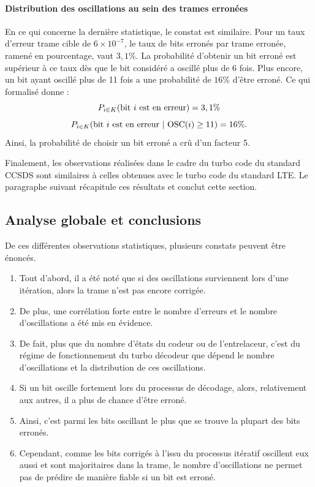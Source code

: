 \paragraph*{Distribution des oscillations au sein des trames erronées}
En ce qui concerne la dernière statistique, le constat est similaire. Pour un  taux d'erreur trame 
cible de $6\times 10^{-7}$, le taux de bits erronés par trame erronée, ramené en pourcentage, vaut $3,1\%$. La probabilité
d'obtenir un bit erroné est supérieur à ce taux dès que le bit considéré a oscillé plus de 6 fois. Plus encore, un bit 
ayant oscillé plus de 11 fois a une probabilité de $16\%$ d'être erroné. Ce qui formalisé donne :
\[P_{i \in K} (\textnormal{bit } i \textnormal{ est en erreur}) = 3,1 \%\]
\[P_{i \in K} (\textnormal{bit } i \textnormal{ est en erreur}\ |\ \textnormal{OSC}(i) \geq 11 ) = 16 \%.\] 
Ainsi, la probabilité de choisir un bit erroné a crû d'un facteur 5. 

Finalement, les observations réalisées dans le cadre du turbo code du standard CCSDS sont similaires à celles obtenues avec
le turbo code du standard LTE. Le paragraphe suivant récapitule ces résultats et conclut cette section.

\subsection{Analyse globale et conclusions}
De ces différentes observations statistiques, plusieurs constats peuvent être énoncés.
\begin{enumerate}
\item Tout d'abord, il a été noté que si des oscillations surviennent lors d'une itération, alors la trame n'est pas encore 
corrigée. 
\item De plus, une corrélation forte entre le nombre d'erreurs et le nombre d'oscillations a été mis en évidence. 
\item De fait, plus que du nombre d'états du codeur ou de l'entrelaceur, c'est du régime de fonctionnement du turbo décodeur que dépend
le nombre d'oscillations et la distribution de ces oscillations.
\item Si un bit oscille fortement lors du processus de décodage, alors, relativement aux autres, il a plus de chance d'être erroné.
\item Ainsi, c'est parmi les bits oscillant le plus que se trouve la plupart des bits erronés.
\item Cependant, comme les bits corrigés à l'issu du processus itératif oscillent eux aussi et sont majoritaires dans la 
trame, le nombre d'oscillations ne permet pas de prédire de manière fiable si un bit est erroné.
\end{enumerate}

